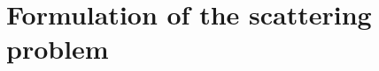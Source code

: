 \documentclass[numreferences]{kluwer}
\renewcommand{\Re}{\operatorname{Re}}
\renewcommand{\i}{\,\mathrm{i}}
\newcommand{\Ttot}{T^+_{\text{tot}}}
\newcommand{\Rtot}{R^+_{\text{tot}}}
\begin{document}


\section{Formulation of the scattering problem}
\label{sec:prel}

\end{document}
